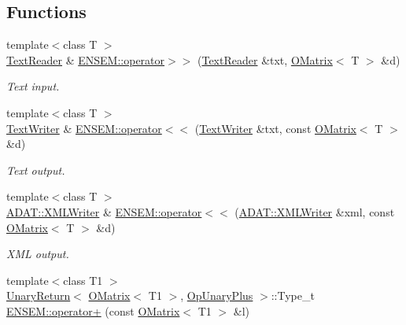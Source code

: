 \subsection*{Functions}
\begin{DoxyCompactItemize}
\item 
{\footnotesize template$<$class T $>$ }\\\mbox{\hyperlink{classENSEM_1_1TextReader}{Text\+Reader}} \& \mbox{\hyperlink{group__obsmatrix_ga2c0b293dbb7aeff91ccffc12fdb0e858}{E\+N\+S\+E\+M\+::operator$>$$>$}} (\mbox{\hyperlink{classENSEM_1_1TextReader}{Text\+Reader}} \&txt, \mbox{\hyperlink{classENSEM_1_1OMatrix}{O\+Matrix}}$<$ T $>$ \&d)
\begin{DoxyCompactList}\small\item\em Text input. \end{DoxyCompactList}\item 
{\footnotesize template$<$class T $>$ }\\\mbox{\hyperlink{classENSEM_1_1TextWriter}{Text\+Writer}} \& \mbox{\hyperlink{group__obsmatrix_gacdc76da3bc2873feb9cad8323ea02e83}{E\+N\+S\+E\+M\+::operator$<$$<$}} (\mbox{\hyperlink{classENSEM_1_1TextWriter}{Text\+Writer}} \&txt, const \mbox{\hyperlink{classENSEM_1_1OMatrix}{O\+Matrix}}$<$ T $>$ \&d)
\begin{DoxyCompactList}\small\item\em Text output. \end{DoxyCompactList}\item 
{\footnotesize template$<$class T $>$ }\\\mbox{\hyperlink{classADATXML_1_1XMLWriter}{A\+D\+A\+T\+::\+X\+M\+L\+Writer}} \& \mbox{\hyperlink{group__obsmatrix_ga62a405af58665d9bce46afb03abd8c90}{E\+N\+S\+E\+M\+::operator$<$$<$}} (\mbox{\hyperlink{classADATXML_1_1XMLWriter}{A\+D\+A\+T\+::\+X\+M\+L\+Writer}} \&xml, const \mbox{\hyperlink{classENSEM_1_1OMatrix}{O\+Matrix}}$<$ T $>$ \&d)
\begin{DoxyCompactList}\small\item\em X\+ML output. \end{DoxyCompactList}\item 
{\footnotesize template$<$class T1 $>$ }\\\mbox{\hyperlink{structENSEM_1_1UnaryReturn}{Unary\+Return}}$<$ \mbox{\hyperlink{classENSEM_1_1OMatrix}{O\+Matrix}}$<$ T1 $>$, \mbox{\hyperlink{structENSEM_1_1OpUnaryPlus}{Op\+Unary\+Plus}} $>$\+::Type\+\_\+t \mbox{\hyperlink{group__obsmatrix_gae4d0316e65f7b3ddc273955cf4801ba6}{E\+N\+S\+E\+M\+::operator+}} (const \mbox{\hyperlink{classENSEM_1_1OMatrix}{O\+Matrix}}$<$ T1 $>$ \&l)

\end{DoxyCompactItemize}
